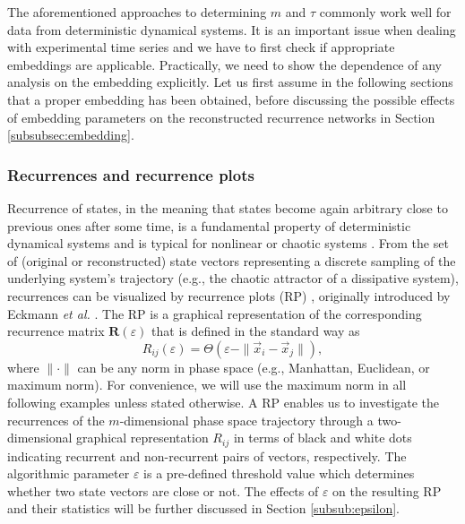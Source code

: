 		The aforementioned approaches to determining $m$ and $\tau$ commonly work well for data from deterministic dynamical systems. It is an important issue when dealing with experimental time series and we have to first check if appropriate embeddings are applicable. Practically, we need to show the dependence of any analysis on the embedding explicitly. Let us first assume in the following sections that a proper embedding has been obtained, before discussing the possible effects of embedding parameters on the reconstructed recurrence networks in Section \ref{subsubsec:embedding}.

		\subsubsection{Recurrences and recurrence plots}
		Recurrence of states, in the meaning that states become again arbitrary close to previous ones after some time, is a fundamental property of deterministic dynamical systems and is typical for nonlinear or chaotic systems \cite{Ott1993,poincare1890}. From the set of (original or reconstructed) state vectors representing a discrete sampling of the underlying system's trajectory (e.g., the chaotic attractor of a dissipative system), recurrences can be visualized by recurrence plots (RP) \cite{marwan2007}, originally introduced by Eckmann {\textit{et al.}} \cite{Eckmann1987}. The RP is a graphical representation of the corresponding recurrence matrix $\textbf{R}(\varepsilon)$ that is defined in the standard way as
\begin{equation} \label{eq:rpDefinition}
R_{ij}(\varepsilon)=\Theta(\varepsilon-\|\vec{x}_i - \vec{x}_j\|),
\end{equation}
\noindent
where $\|\cdot\|$ can be any norm in phase space (e.g., Manhattan, Euclidean, or maximum norm). For convenience, we will use the maximum norm in all following examples unless stated otherwise. A RP enables us to investigate the recurrences of the $m$-dimensional phase space trajectory through a two-dimensional graphical representation $R_{ij}$ in terms of black and white dots indicating recurrent and non-recurrent pairs of vectors, respectively. The algorithmic parameter $\varepsilon$ is a pre-defined threshold value which determines whether two state vectors are close or not. The effects of $\varepsilon$ on the resulting RP and their statistics will be further discussed in Section \ref{subsub:epsilon}.

